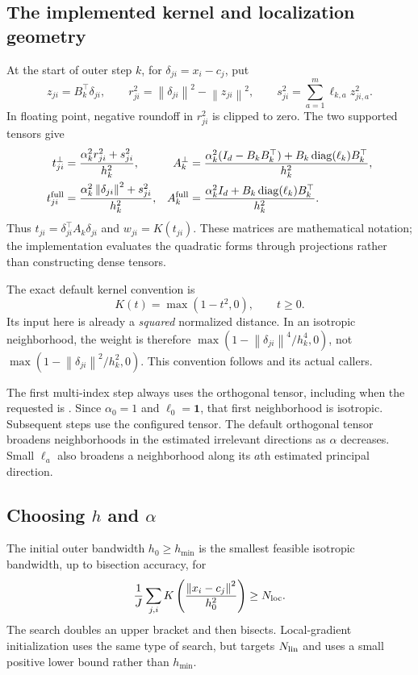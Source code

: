 \documentclass[11pt,a4paper]{article}
\newcommand{\diag}{\operatorname{diag}}
\newcommand{\norm}[1]{\left\lVert#1\right\rVert}
\newcommand{\code}[1]{\texttt{\detokenize{#1}}}
\begin{document}
\subsection{The implemented kernel and localization geometry}
At the start of outer step $k$, for $\delta_{ji}=x_i-c_j$, put
\begin{equation}\label{eq:components}
 z_{ji}=B_k^\top\delta_{ji},\qquad
 r_{ji}^2=\norm{\delta_{ji}}^2-\norm{z_{ji}}^2,\qquad
 s_{ji}^2=\sum_{a=1}^m\ell_{k,a}z_{ji,a}^2.
\end{equation}
In floating point, negative roundoff in $r_{ji}^2$ is clipped to zero.
The two supported tensors give
\begin{align}
 t_{ji}^{\perp}&=\frac{\alpha_k^2 r_{ji}^2+s_{ji}^2}{h_k^2},
 &A_k^{\perp}&=\frac{\alpha_k^2(I_d-B_kB_k^\top)
                  +B_k\diag(\ell_k)B_k^\top}{h_k^2},\label{eq:orthogonal}\\
 t_{ji}^{\rm full}&=\frac{\alpha_k^2\norm{\delta_{ji}}^2+s_{ji}^2}{h_k^2},
 &A_k^{\rm full}&=\frac{\alpha_k^2I_d
                  +B_k\diag(\ell_k)B_k^\top}{h_k^2}.
 \label{eq:full}
\end{align}
Thus $t_{ji}=\delta_{ji}^\top A_k\delta_{ji}$ and $w_{ji}=K(t_{ji})$.
These matrices are mathematical notation; the implementation evaluates the
quadratic forms through projections rather than constructing dense tensors.

The exact default kernel convention is
\begin{equation}\label{eq:kernel}
 K(t)=\max(1-t^2,0),\qquad t\ge0.
\end{equation}
Its input here is already a \emph{squared} normalized distance. In an
isotropic neighborhood, the weight is therefore
$\max(1-\norm{\delta_{ji}}^4/h_k^4,0)$, not
$\max(1-\norm{\delta_{ji}}^2/h_k^2,0)$. This convention follows
\code{epanechnikov} and its actual callers.

The first multi-index step always uses the orthogonal tensor, including
when the requested \code{multi_tensor} is \code{full}. Since
$\alpha_0=1$ and $\ell_0=\bm 1$, that first neighborhood is isotropic.
Subsequent steps use the configured tensor. The default orthogonal tensor
broadens neighborhoods in the estimated irrelevant directions as $\alpha$
decreases. Small $\ell_a$ also broadens a neighborhood along its $a$th
estimated principal direction.

\subsection{Choosing \texorpdfstring{$h$ and $\alpha$}{h and alpha}}
The initial outer bandwidth $h_0\ge h_{\min}$ is the smallest feasible
isotropic bandwidth, up to bisection accuracy, for
\begin{equation}\label{eq:h-search}
 \frac1J\sum_{j,i}K\left(\frac{\norm{x_i-c_j}^2}{h_0^2}\right)
 \ge N_{\rm loc}.
\end{equation}
The search doubles an upper bracket and then bisects. Local-gradient
initialization uses the same type of search, but targets $N_{\rm lin}$
and uses a small positive lower bound rather than $h_{\min}$.
\end{document}
